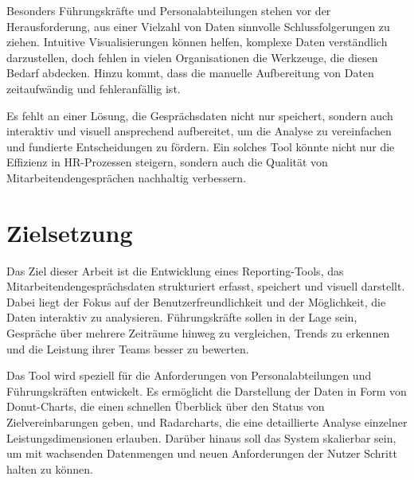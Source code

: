 Besonders Führungskräfte und Personalabteilungen stehen vor der Herausforderung, aus einer Vielzahl von Daten sinnvolle Schlussfolgerungen zu ziehen. Intuitive Visualisierungen können helfen, komplexe Daten verständlich darzustellen, doch fehlen in vielen Organisationen die Werkzeuge, die diesen Bedarf abdecken. Hinzu kommt, dass die manuelle Aufbereitung von Daten zeitaufwändig und fehleranfällig ist. 

Es fehlt an einer Lösung, die Gesprächsdaten nicht nur speichert, sondern auch interaktiv und visuell ansprechend aufbereitet, um die Analyse zu vereinfachen und fundierte Entscheidungen zu fördern. Ein solches Tool könnte nicht nur die Effizienz in HR-Prozessen steigern, sondern auch die Qualität von Mitarbeitendengesprächen nachhaltig verbessern.

\section{Zielsetzung}
Das Ziel dieser Arbeit ist die Entwicklung eines Reporting-Tools, das Mitarbeitendengesprächsdaten strukturiert erfasst, speichert und visuell darstellt. Dabei liegt der Fokus auf der Benutzerfreundlichkeit und der Möglichkeit, die Daten interaktiv zu analysieren. Führungskräfte sollen in der Lage sein, Gespräche über mehrere Zeiträume hinweg zu vergleichen, Trends zu erkennen und die Leistung ihrer Teams besser zu bewerten.

Das Tool wird speziell für die Anforderungen von Personalabteilungen und Führungskräften entwickelt. Es ermöglicht die Darstellung der Daten in Form von Donut-Charts, die einen schnellen Überblick über den Status von Zielvereinbarungen geben, und Radarcharts, die eine detaillierte Analyse einzelner Leistungsdimensionen erlauben. Darüber hinaus soll das System skalierbar sein, um mit wachsenden Datenmengen und neuen Anforderungen der Nutzer Schritt halten zu können. 

